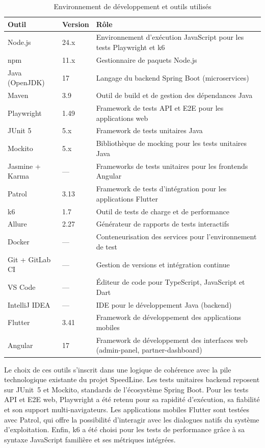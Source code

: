 \begin{table}[H]
\centering
\caption{Environnement de développement et outils utilisés}
\label{tab:env-dev}
\begin{tabularx}{\textwidth}{l l X}
\toprule
\textbf{Outil} & \textbf{Version} & \textbf{Rôle} \\
\midrule
Node.js          & 24.x   & Environnement d'exécution JavaScript pour les tests Playwright et k6 \\
npm              & 11.x   & Gestionnaire de paquets Node.js \\
Java (OpenJDK)   & 17     & Langage du backend Spring Boot (microservices) \\
Maven            & 3.9    & Outil de build et de gestion des dépendances Java \\
Playwright       & 1.49   & Framework de tests API et E2E pour les applications web \\
JUnit 5          & 5.x    & Framework de tests unitaires Java \\
Mockito          & 5.x    & Bibliothèque de mocking pour les tests unitaires Java \\
Jasmine + Karma  & ---    & Frameworks de tests unitaires pour les frontends Angular \\
Patrol           & 3.13   & Framework de tests d'intégration pour les applications Flutter \\
k6               & 1.7    & Outil de tests de charge et de performance \\
Allure           & 2.27   & Générateur de rapports de tests interactifs \\
Docker           & ---    & Conteneurisation des services pour l'environnement de test \\
Git + GitLab CI  & ---    & Gestion de versions et intégration continue \\
VS Code          & ---    & Éditeur de code pour TypeScript, JavaScript et Dart \\
IntelliJ IDEA    & ---    & IDE pour le développement Java (backend) \\
Flutter          & 3.41   & Framework de développement des applications mobiles \\
Angular          & 17     & Framework de développement des interfaces web (admin-panel, partner-dashboard) \\
\bottomrule
\end{tabularx}
\end{table}

Le choix de ces outils s'inscrit dans une logique de cohérence avec la pile technologique
existante du projet SpeedLine. Les tests unitaires backend reposent sur JUnit~5 et Mockito,
standards de l'écosystème Spring Boot. Pour les tests API et E2E web, Playwright a été
retenu pour sa rapidité d'exécution, sa fiabilité et son support multi-navigateurs.
Les applications mobiles Flutter sont testées avec Patrol, qui offre la possibilité
d'interagir avec les dialogues natifs du système d'exploitation. Enfin, k6 a été choisi
pour les tests de performance grâce à sa syntaxe JavaScript familière et ses métriques
intégrées.

